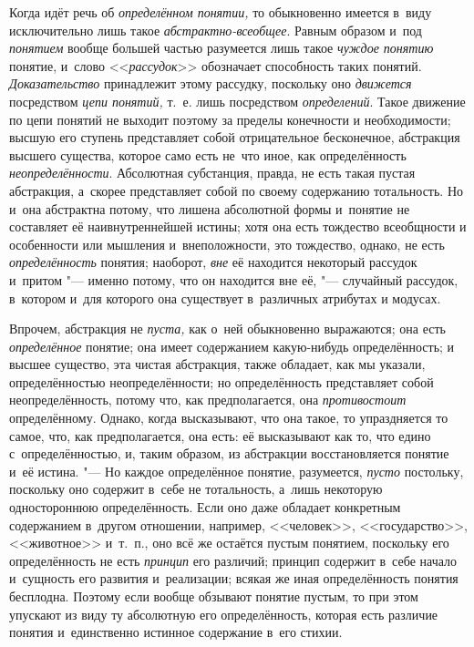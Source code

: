 Когда идёт речь об {\em определённом понятии,}
то обыкновенно имеется в~виду исключительно лишь такое
{\em абстрактно-всеобщее}. Равным образом и~под
{\em понятием} вообще большей частью разумеется лишь такое
{\em чуждое понятию} понятие, и~слово <<{\em рассудок}>>
обозначает способность таких понятий. {\em Доказательство}
принадлежит этому рассудку, поскольку оно {\em движется}
посредством {\em цепи понятий,} т.~е. лишь посредством {\em определений}.
Такое движение по цепи понятий не выходит поэтому за пределы конечности и
необходимости; высшую его ступень представляет собой отрицательное
бесконечное, абстракция высшего существа, которое само есть не~что иное,
как определённость {\em неопределённости}.
Абсолютная субстанция, правда, не есть такая пустая
абстракция, а~скорее представляет собой по своему содержанию тотальность.
Но и~она абстрактна потому, что лишена абсолютной формы и~понятие не
составляет её наивнутреннейшей истины; хотя она есть тождество всеобщности
и особенности или мышления и~внеположности, это тождество,
однако, не есть {\em определённость} понятия; наоборот, {\em вне} её находится
некоторый рассудок и~притом "--- именно потому, что он
находится вне её, "--- случайный рассудок, в~котором и~для
которого она существует в~различных атрибутах и
модусах.

Впрочем, абстракция не {\em пуста,} как о~ней
обыкновенно выражаются; она есть {\em определённое}
понятие; она имеет содержанием какую-нибудь определённость; и
высшее существо, эта чистая абстракция, также обладает, как мы указали,
определённостью неопределённости; но определённость представляет собой
неопределённость, потому что, как предполагается, она {\em противостоит}
определённому. Однако, когда высказывают, что она такое, то
упраздняется то самое, что, как предполагается, она есть: её высказывают
как то, что едино с~определённостью, и, таким образом, из абстракции
восстановляется понятие и~её истина. "--- Но каждое
определённое понятие, разумеется, {\em пусто} постольку,
поскольку оно содержит в~себе не тотальность, а~лишь некоторую одностороннюю
определённость. Если оно даже обладает конкретным содержанием в~другом
отношении, например, <<человек>>, <<государство>>, <<животное>> и~т.~п.,
оно всё же остаётся пустым понятием, поскольку его определённость не есть
{\em принцип} его различий; принцип содержит в~себе начало и~сущность его
развития и~реализации; всякая же иная определённость понятия бесплодна. Поэтому
если вообще обзывают понятие пустым, то при этом упускают из виду ту абсолютную
его определённость, которая есть различие понятия и~единственно истинное
содержание в~его стихии.

